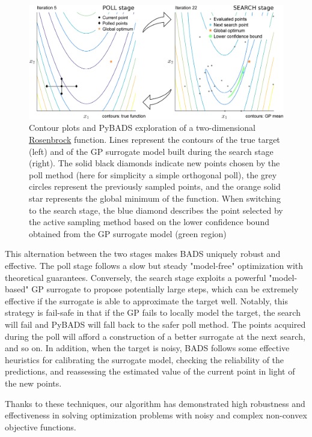 \documentclass[
]{article}
\begin{document}
\begin{figure}[th!]
	\centering
	\includegraphics[width=\textwidth]{bads-optimization.png}
	\caption{Contour plots and PyBADS exploration of a two-dimensional \href{https://en.wikipedia.org/wiki/Rosenbrock\_function}{Rosenbrock} function. Lines represent the contours of the true target (left) and of the GP surrogate model built during the search stage (right). The solid black diamonds indicate new points chosen by the poll method (here for simplicity a simple orthogonal poll), the grey circles represent the previously sampled points, and the orange solid star represents the global minimum of the function. When switching to the search stage, the blue diamond describes the point selected by the active sampling method based on the lower confidence bound obtained from the GP surrogate model (green region)}
	\label{fig:example}
\end{figure}

This alternation between the two stages makes BADS uniquely robust and effective. The poll stage follows a slow but steady "model-free" optimization with theoretical guarantees. Conversely, the search stage exploits a powerful "model-based" GP surrogate to propose potentially large steps, which can be extremely effective if the surrogate is able to approximate the target well. Notably, this strategy is fail-safe in that if the GP fails to locally model the target, the search will fail and PyBADS will fall back to the safer poll method. The points acquired during the poll will afford a construction of a better surrogate at the next search, and so on.
In addition, when the target is noisy, BADS follows some effective heuristics for calibrating the surrogate model, checking the reliability of the predictions, and reassessing the estimated value of the current point in light of the new points. 

Thanks to these techniques, our algorithm has demonstrated high robustness and effectiveness in solving optimization problems with noisy and complex non-convex objective functions.
\end{document}
